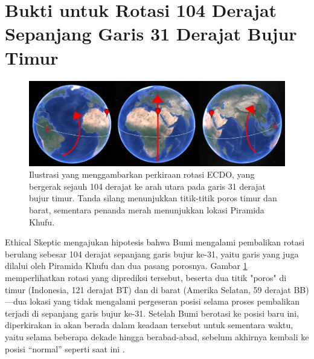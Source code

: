 \documentclass[10pt,twocolumn,letterpaper]{article}
\begin{document}
\section{Bukti untuk Rotasi 104 Derajat Sepanjang Garis 31 Derajat Bujur Timur}

\begin{figure}[t]
\begin{center}
\includegraphics[width=1\textwidth]{drawing.jpg}
\end{center}
   \caption{Ilustrasi yang menggambarkan perkiraan rotasi ECDO, yang bergerak sejauh 104 derajat ke arah utara pada garis 31 derajat bujur timur. Tanda silang menunjukkan titik-titik poros timur dan barat, sementara penanda merah menunjukkan lokasi Piramida Khufu.}
\label{fig:6}
\end{figure}

Ethical Skeptic mengajukan hipotesis bahwa Bumi mengalami pembalikan rotasi berulang sebesar 104 derajat sepanjang garis bujur ke-31, yaitu garis yang juga dilalui oleh Piramida Khufu dan dua pasang porosnya. Gambar \ref{fig:6} memperlihatkan rotasi yang diprediksi tersebut, beserta dua titik "poros" di timur (Indonesia, 121 derajat BT) dan di barat (Amerika Selatan, 59 derajat BB)—dua lokasi yang tidak mengalami pergeseran posisi selama proses pembalikan terjadi di sepanjang garis bujur ke-31. Setelah Bumi berotasi ke posisi baru ini, diperkirakan ia akan berada dalam keadaan tersebut untuk sementara waktu, yaitu selama beberapa dekade hingga berabad-abad, sebelum akhirnya kembali ke posisi “normal” seperti saat ini \cite{150}.
\end{document}

